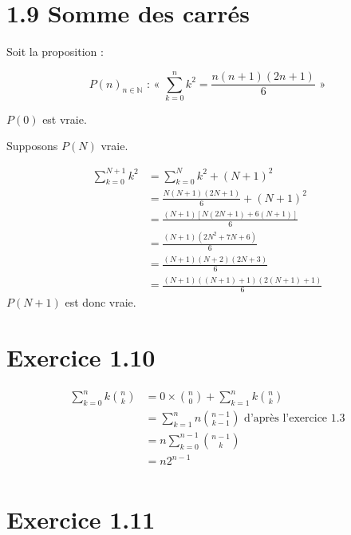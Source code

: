 \documentclass{report}
\begin{document}
\section*{1.9 Somme des carrés}

Soit la proposition :

\begin{displaymath}
	P(n)_{n \in \mathbb{N}} \text{ : « } \sum_{k=0}^{n}k^2 = \frac{n(n+1)(2n+1)}{6} \text{ »}
\end{displaymath}

$P(0)$ est vraie.

Supposons $P(N)$ vraie.

\begin{equation*}
	\begin{split}
		\sum_{k=0}^{N+1}k^2 &= \sum_{k=0}^{N}k^2 + (N+1)^2 \\
		                    &= \frac{N(N+1)(2N+1)}{6} + (N+1)^2 \\
		                    &= \frac{(N+1)\left[N(2N+1) + 6(N+1)\right]}{6} \\
		                    &= \frac{(N+1)(2N^2 + 7N +6)}{6} \\
		                    &= \frac{(N+1)(N+2)(2N + 3)}{6} \\
		                    &= \frac{(N+1)((N+1)+1)(2(N+1) + 1)}{6}
	\end{split}
\end{equation*}
$P(N+1)$ est donc vraie.

\section*{Exercice 1.10}
\begin{equation*}
	\begin{split}
		\sum_{k=0}^{n} k\binom{n}{k} &= 0 \times \binom{n}{0} + \sum_{k=1}^{n} k\binom{n}{k}\\
		                             &= \sum_{k=1}^{n} n\binom{n-1}{k-1} \text{ d'après l'exercice 1.3}\\
		                             &= n\sum_{k=0}^{n-1} \binom{n-1}{k} \\
		                             &= n 2^{n-1} \\
	\end{split}
\end{equation*}


\section*{Exercice 1.11}
\end{document}

